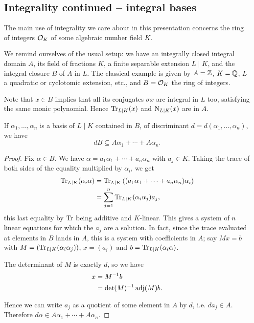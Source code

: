 \subsection{Integrality continued -- integral bases}


The main use of integrality we care about in this presentation concerns the ring of integers $\mathcal{O}_K$ of some algebraic number field $K$. 

We remind ourselves of the usual setup: we have an integrally closed integral domain $A$, its field of fractions $K$, a finite separable extension $L\mid K$, and the integral closure $B$ of $A$ in $L$. The classical example is given by $A=\mathbb{Z}$, $K=\mathbb{Q}$, $L$ a quadratic or cyclotomic extension, etc., and $B=\mathcal{O}_K$ the ring of integers.

Note that $x\in B$ implies that all its conjugates $\sigma x$ are integral in $L$ too, satisfying the same monic polynomial. Hence $\operatorname{Tr}_{L\mid K}(x)$ and $\operatorname{N}_{L\mid K}(x)$ are in $A$.

\begin{lem}[Neukirch 2.9]
	If $\alpha_1,\dots,\alpha_n$ is a basis of $L\mid K$ contained in $B$, of discriminant $d=d(\alpha_1,\dots,\alpha_n)$, we have
	\[
		dB\subseteq A\alpha_1 + \cdots + A\alpha_n.
	\]
\end{lem}
\begin{proof}
	Fix $\alpha\in B$. We have $\alpha=a_1\alpha_1+\cdots+a_n\alpha_n$ with $a_j\in K$. Taking the trace of both sides of the equality multiplied by $\alpha_i$, we get
	\begin{align*}
		\operatorname{Tr}_{L\mid K}(\alpha_i \alpha) &= \operatorname{Tr}_{L\mid K}\left((a_1\alpha_1+\cdots+a_n\alpha_n)\alpha_i\right)\\
			&= \sum_{j=1}^n \operatorname{Tr}_{L\mid K}(\alpha_i\alpha_j) a_j,
	\end{align*}
	this last equality by $\operatorname{Tr}$ being additive and $K$-linear. This gives a system of $n$ linear equations for which the $a_j$ are a solution. In fact, since the trace evaluated at elements in $B$ lands in $A$, this is a system with coefficients in $A$; say $Mx=b$ with $M=(\operatorname{Tr}_{L\mid K}(\alpha_i\alpha_j))$, $x=(a_i)$ and $b=\operatorname{Tr}_{L\mid K}(\alpha_i\alpha)$.

	The determinant of $M$ is exactly $d$, so we have
	\begin{align*}
		x &= M^{-1} b\\
		  &= \det(M)^{-1}\operatorname{adj}(M)b.
	\end{align*}
	
	Hence we can write $a_j$ as a quotient of some element in $A$ by $d$, i.e. $da_j\in A$. Therefore $d\alpha\in A\alpha_1+\cdots+A\alpha_n$.
\end{proof}

